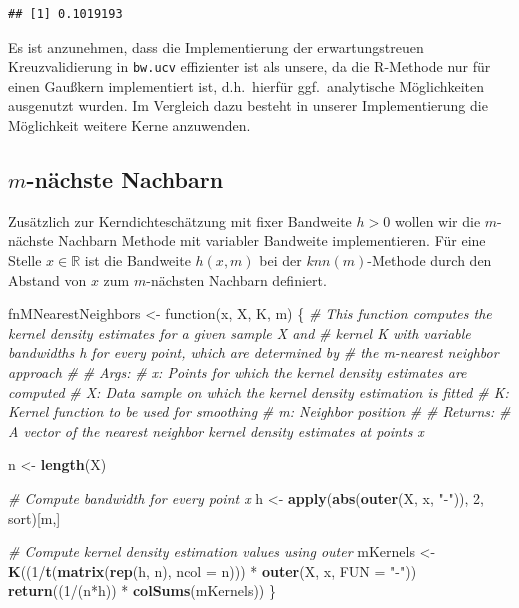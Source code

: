 \documentclass[10pt,]{article}
\newenvironment{Shaded}{\begin{snugshade}}{\end{snugshade}}
\newcommand{\KeywordTok}[1]{\textcolor[rgb]{0.13,0.29,0.53}{\textbf{{#1}}}}
\newcommand{\DataTypeTok}[1]{\textcolor[rgb]{0.13,0.29,0.53}{{#1}}}
\newcommand{\DecValTok}[1]{\textcolor[rgb]{0.00,0.00,0.81}{{#1}}}
\newcommand{\StringTok}[1]{\textcolor[rgb]{0.31,0.60,0.02}{{#1}}}
\newcommand{\CommentTok}[1]{\textcolor[rgb]{0.56,0.35,0.01}{\textit{{#1}}}}
\newcommand{\NormalTok}[1]{{#1}}
\begin{document}
\begin{verbatim}
## [1] 0.1019193
\end{verbatim}

Es ist anzunehmen, dass die Implementierung der erwartungstreuen
Kreuzvalidierung in \texttt{bw.ucv} effizienter ist als unsere, da die
R-Methode nur für einen Gaußkern implementiert ist, d.h.~hierfür
ggf.~analytische Möglichkeiten ausgenutzt wurden. Im Vergleich dazu
besteht in unserer Implementierung die Möglichkeit weitere Kerne
anzuwenden.

\subsection{\texorpdfstring{\(m\)-nächste
Nachbarn}{m-nächste Nachbarn}}\label{m-nachste-nachbarn}

Zusätzlich zur Kerndichteschätzung mit fixer Bandweite \(h > 0\) wollen
wir die \(m\)-nächste Nachbarn Methode mit variabler Bandweite
implementieren. Für eine Stelle \(x \in \mathbb{R}\) ist die Bandweite
\(h(x,m)\) bei der \(knn(m)\)-Methode durch den Abstand von \(x\) zum
\(m\)-nächsten Nachbarn definiert.

\begin{Shaded}
\begin{Highlighting}[]
\NormalTok{fnMNearestNeighbors <-}\StringTok{ }\NormalTok{function(x, X, K, m) \{}
  \CommentTok{# This function computes the kernel density estimates for a given sample X and}
  \CommentTok{# kernel K with variable bandwidths h for every point, which are determined by}
  \CommentTok{# the m-nearest neighbor approach}
  \CommentTok{# }
  \CommentTok{# Args:}
  \CommentTok{#   x: Points for which the kernel density estimates are computed}
  \CommentTok{#   X: Data sample on which the kernel density estimation is fitted}
  \CommentTok{#   K: Kernel function to be used for smoothing}
  \CommentTok{#   m: Neighbor position}
  \CommentTok{#   }
  \CommentTok{# Returns:}
  \CommentTok{#   A vector of the nearest neighbor kernel density estimates at points x}
  
  \NormalTok{n <-}\StringTok{ }\KeywordTok{length}\NormalTok{(X)}
  
  \CommentTok{# Compute bandwidth for every point x}
  \NormalTok{h <-}\StringTok{ }\KeywordTok{apply}\NormalTok{(}\KeywordTok{abs}\NormalTok{(}\KeywordTok{outer}\NormalTok{(X, x, }\StringTok{"-"}\NormalTok{)), }\DecValTok{2}\NormalTok{, sort)[m,]}
  
  \CommentTok{# Compute kernel density estimation values using outer}
  \NormalTok{mKernels <-}\StringTok{ }\KeywordTok{K}\NormalTok{((}\DecValTok{1}\NormalTok{/}\KeywordTok{t}\NormalTok{(}\KeywordTok{matrix}\NormalTok{(}\KeywordTok{rep}\NormalTok{(h, n), }\DataTypeTok{ncol =} \NormalTok{n))) *}\StringTok{ }\KeywordTok{outer}\NormalTok{(X, x, }\DataTypeTok{FUN =} \StringTok{"-"}\NormalTok{))}
  \KeywordTok{return}\NormalTok{((}\DecValTok{1}\NormalTok{/(n*h)) *}\StringTok{ }\KeywordTok{colSums}\NormalTok{(mKernels))}
\NormalTok{\}}
\end{Highlighting}
\end{Shaded}
\end{document}
